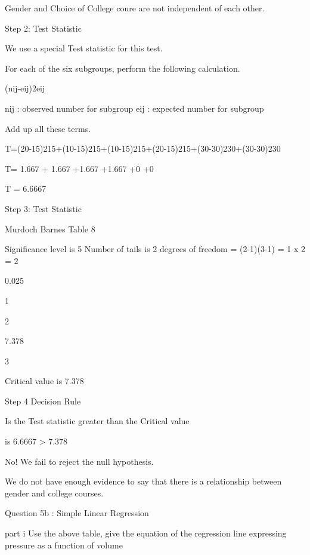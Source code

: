     Gender and Choice of College coure are not independent of each other.
 
 
Step 2: Test Statistic
 
We use a special Test statistic for this test.
 
For each of the six subgroups, perform the following calculation.
 
        (nij-eij)2eij
 
    nij : observed number for subgroup
    eij : expected number for subgroup
 
Add up all these terms.
 
 T=(20-15)215+(10-15)215+(10-15)215+(20-15)215+(30-30)230+(30-30)230
 
 
 T= 1.667 + 1.667 +1.667 +1.667 +0 +0 
 
 
 T = 6.6667 
 
 
Step 3: Test Statistic
 
Murdoch Barnes Table 8
 
Significance level is 5%
Number of tails is 2
degrees of freedom = (2-1)(3-1) = 1 x 2 = 2
 
 





0.025


1






2


7.378


3














 
 
Critical value is 7.378
 
Step 4 Decision Rule
 
Is the Test statistic greater than the Critical value
 
is 6.6667 > 7.378
 
No! We fail to reject the null hypothesis.
 
We do not have enough evidence to say that there is a relationship between gender and college courses.
 
 
 
 
 
 
Question 5b : Simple Linear Regression

 
part i
Use the above table, give the equation of the regression line expressing pressure as a function of volume
 
